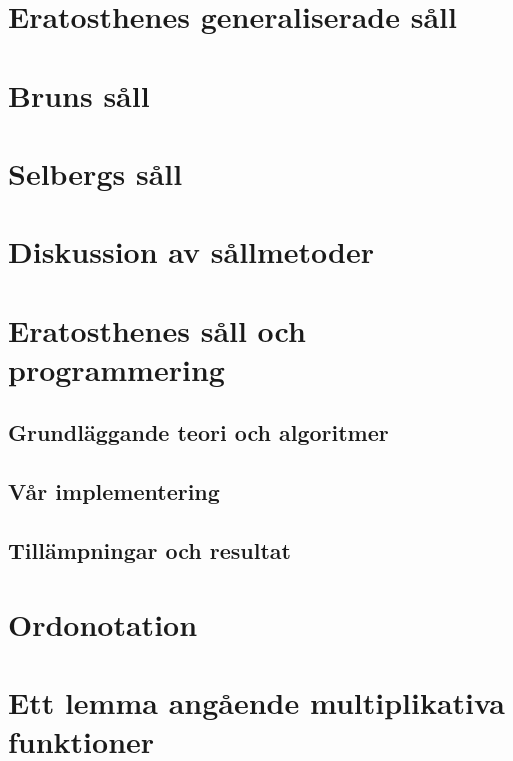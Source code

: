 \documentclass[a4paper]{article}
\begin{document}
\section{Eratosthenes generaliserade såll} \label{Eratosthenes}


\section{Bruns såll} \label{brun}


\section{Selbergs såll} \label{Selberg}


\section{Diskussion av sållmetoder}


\section{Eratosthenes såll och programmering}

\subsection{Grundläggande teori och algoritmer}

\subsection{Vår implementering}

\subsection{Tillämpningar och resultat}



%


\newpage
\printbibliography

\medskip

\newpage
\appendix
\section{Ordonotation}

\section{Ett lemma angående multiplikativa funktioner}

\end{document}
